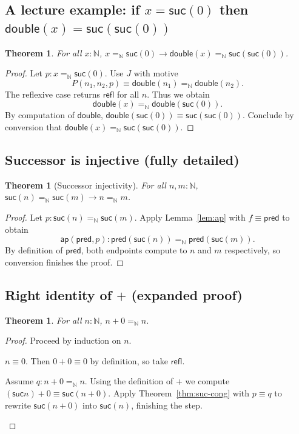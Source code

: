 \documentclass[11pt]{article}
\newcommand{\Nat}{\mathbb{N}}
\newcommand{\suc}{\mathsf{suc}}
\newcommand{\Id}[3]{#1 =_{#2} #3}
\newcommand{\refl}{\mathsf{refl}}
\newcommand{\ap}{\mathsf{ap}}
\theoremstyle{definition}
\theoremstyle{plain}
\newtheorem{theorem}[definition]{Theorem}
\theoremstyle{remark}
\begin{document}
\subsection{A lecture example: if $x = \suc(0)$ then $\mathsf{double}(x) = \suc(\suc(0))$}
\begin{theorem}\label{thm:lecture}
For all $x{:}\Nat$, $\Id{x}{\Nat}{\suc(0)} \to \Id{\mathsf{double}(x)}{\Nat}{\suc(\suc(0))}$.
\end{theorem}
\begin{proof}
Let $p{:}\Id{x}{\Nat}{\suc(0)}$. Use $J$ with motive
\begin{equation*}
P(n_1,n_2,p) \equiv \Id{\mathsf{double}(n_1)}{\Nat}{\mathsf{double}(n_2)}.
\end{equation*}
The reflexive case returns $\refl$ for all $n$. Thus we obtain
\begin{equation*}
\Id{\mathsf{double}(x)}{\Nat}{\mathsf{double}(\suc(0))}.
\end{equation*}
By computation of $\mathsf{double}$, $\mathsf{double}(\suc(0)) \equiv \suc(\suc(0))$. Conclude by conversion that
$\Id{\mathsf{double}(x)}{\Nat}{\suc(\suc(0))}$.
\end{proof}

\subsection{Successor is injective (fully detailed)}
\begin{theorem}[Successor injectivity]\label{thm:suc-inj}
For all $n,m{:}\Nat$, $\Id{\suc(n)}{\Nat}{\suc(m)} \to \Id{n}{\Nat}{m}$.
\end{theorem}
\begin{proof}
Let $p{:}\Id{\suc(n)}{\Nat}{\suc(m)}$. Apply Lemma~\ref{lem:ap} with $f \equiv \mathsf{pred}$ to obtain
\begin{equation*}
\ap(\mathsf{pred}, p) : \Id{\mathsf{pred}(\suc(n))}{\Nat}{\mathsf{pred}(\suc(m))}.
\end{equation*}
By definition of $\mathsf{pred}$, both endpoints compute to $n$ and $m$ respectively, so conversion finishes the proof.
\end{proof}

\subsection{Right identity of $+$ (expanded proof)}
\begin{theorem}\label{thm:plus-right}
For all $n{:}\Nat$, $\Id{n + 0}{\Nat}{n}$.
\end{theorem}
\begin{proof}
Proceed by induction on $n$.
\begin{description}[leftmargin=2em]
\item[Base.] $n \equiv 0$. Then $0 + 0 \equiv 0$ by definition, so take $\refl$.
\item[Step.] Assume $q : \Id{n + 0}{\Nat}{n}$. Using the definition of $+$ we compute $(\suc n) + 0 \equiv \suc(n + 0)$. Apply Theorem~\ref{thm:suc-cong} with $p \equiv q$ to rewrite $\suc(n + 0)$ into $\suc(n)$, finishing the step.
\end{description}
\end{proof}
\end{document}
